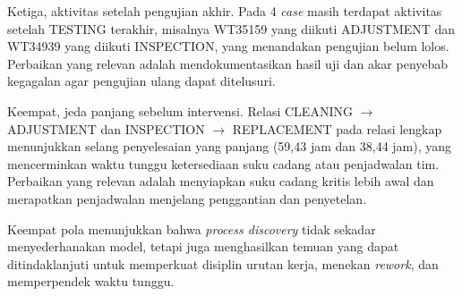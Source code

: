 Ketiga, aktivitas setelah pengujian akhir. Pada 4 \textit{case} masih terdapat aktivitas setelah TESTING terakhir, misalnya WT35159 yang diikuti ADJUSTMENT dan WT34939 yang diikuti INSPECTION, yang menandakan pengujian belum lolos. Perbaikan yang relevan adalah mendokumentasikan hasil uji dan akar penyebab kegagalan agar pengujian ulang dapat ditelusuri.

Keempat, jeda panjang sebelum intervensi. Relasi CLEANING $\rightarrow$ ADJUSTMENT dan INSPECTION $\rightarrow$ REPLACEMENT pada relasi lengkap menunjukkan selang penyelesaian yang panjang (59,43 jam dan 38,44 jam), yang mencerminkan waktu tunggu ketersediaan suku cadang atau penjadwalan tim. Perbaikan yang relevan adalah menyiapkan suku cadang kritis lebih awal dan merapatkan penjadwalan menjelang penggantian dan penyetelan.

Keempat pola menunjukkan bahwa \textit{process discovery} tidak sekadar menyederhanakan model, tetapi juga menghasilkan temuan yang dapat ditindaklanjuti untuk memperkuat disiplin urutan kerja, menekan \textit{rework}, dan memperpendek waktu tunggu.
